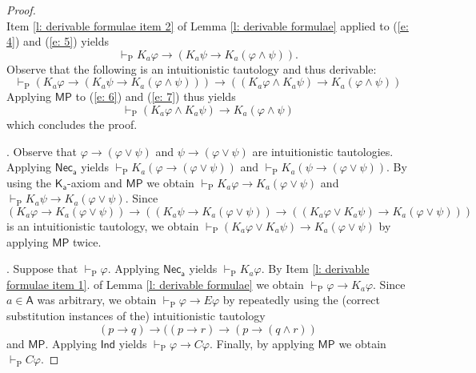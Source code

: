 \documentclass{myifcolog}
\newcommand\C {C}
\newcommand{\K}{K}
\newcommand\A{\mathsf{A}}
\newcommand{\agi}{a}
\newcommand{\E}{E}
\newcommand{\hickp}{\mathrm{P}}
\numberwithin{theorem}{section}
\begin{document}
\begin{proof}
\begin{equation}
    \end{equation}
    Item \ref{l: derivable formulae item 2} of Lemma \ref{l: derivable formulae} applied to (\ref{e: 4}) and (\ref{e: 5}) yields
    \begin{equation}\label{e: 6}
        \vdash_\hickp \K_\agi \varphi \rightarrow (\K_\agi \psi \rightarrow \K_\agi (\varphi \wedge \psi)).
    \end{equation}
    Observe that the following is an intuitionistic tautology and thus derivable:
    \begin{equation}\label{e: 7}
        \vdash_\hickp (\K_\agi \varphi \rightarrow (\K_\agi \psi \rightarrow \K_\agi (\varphi \wedge \psi))) \rightarrow ((\K_\agi \varphi \wedge \K_\agi \psi) \rightarrow \K_\agi (\varphi \wedge \psi))
    \end{equation}
    Applying $\mathsf{MP}$ to (\ref{e: 6}) and (\ref{e: 7}) thus yields
    \begin{equation}\label{e: 8}
       \vdash_\hickp (\K_\agi \varphi \wedge \K_\agi \psi) \rightarrow \K_\agi (\varphi \wedge \psi)
    \end{equation}
    which concludes the proof. \smallskip
    
    . Observe that $\varphi \rightarrow (\varphi \vee \psi)$ and $\psi \rightarrow (\varphi \vee \psi)$ are intuitionistic tautologies. Applying $\mathsf{Nec_\agi}$ yields $\vdash_\hickp \K_\agi(\varphi \rightarrow (\varphi \vee \psi))$ and $\vdash_\hickp \K_\agi(\psi \rightarrow (\varphi \vee \psi))$. By using the $\mathsf{K_\agi}$-axiom and $\mathsf{MP}$ we obtain $\vdash_\hickp \K_\agi \varphi \rightarrow \K_\agi (\varphi \vee \psi)$ and $\vdash_\hickp \K_\agi \psi \rightarrow \K_\agi (\varphi \vee \psi)$. Since
    \begin{equation*}
        (\K_\agi \varphi \rightarrow \K_\agi(\varphi \vee \psi)) \rightarrow ((\K_\agi \psi \rightarrow \K_\agi(\varphi \vee \psi)) \rightarrow ((\K_\agi \varphi \vee \K_\agi \psi) \rightarrow \K_\agi(\varphi \vee \psi)))
    \end{equation*}
    is an intuitionistic tautology, we obtain $\vdash_\hickp (\K_\agi \varphi \vee \K_\agi \psi) \rightarrow \K_\agi (\varphi \vee \psi)$ by applying $\mathsf{MP}$ twice. \smallskip 
    
    . Suppose that $\vdash_\hickp \varphi$. Applying $\mathsf{Nec_\agi}$ yields $\vdash_\hickp \K_\agi \varphi$. By Item \ref{l: derivable formulae item 1}. of Lemma \ref{l: derivable formulae} we obtain $\vdash_\hickp \varphi \rightarrow \K_\agi \varphi$. Since $\agi \in \A$ was arbitrary, we obtain $\vdash_\hickp \varphi \rightarrow \E \varphi$ by repeatedly using the (correct substitution instances of the) intuitionistic tautology 
    \begin{equation*}
        (p \rightarrow q) \rightarrow ((p \rightarrow r) \rightarrow (p \rightarrow (q \wedge r))
    \end{equation*}
    and $\mathsf{MP}$. Applying $\mathsf{Ind}$ yields $\vdash_\hickp \varphi \rightarrow \C \varphi$. Finally, by applying $\mathsf{MP}$ we obtain $\vdash_\hickp \C \varphi$. \smallskip


\end{proof}
\end{document}

